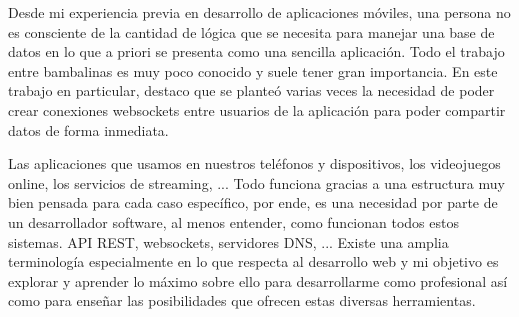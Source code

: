 Desde mi experiencia previa en desarrollo de aplicaciones móviles, una persona no es consciente de la cantidad de lógica que se necesita para manejar una base
de datos en lo que a priori se presenta como una sencilla aplicación. Todo el trabajo entre bambalinas es muy poco conocido y suele tener gran importancia. En este trabajo en particular,
destaco que se planteó varias veces la necesidad de poder crear conexiones websockets entre usuarios de la aplicación para poder compartir datos de forma inmediata.

Las aplicaciones que usamos en nuestros teléfonos y dispositivos, los videojuegos online, los servicios de streaming, ... Todo funciona gracias a una estructura muy bien pensada para cada caso
específico, por ende, es una necesidad por parte de un desarrollador software, al menos entender, como funcionan todos estos sistemas. API REST, websockets, servidores DNS, ...  Existe una amplia terminología
especialmente en lo que respecta al desarrollo web y mi objetivo es explorar y aprender lo máximo sobre ello para desarrollarme como profesional así como para enseñar las posibilidades que ofrecen estas diversas herramientas.
